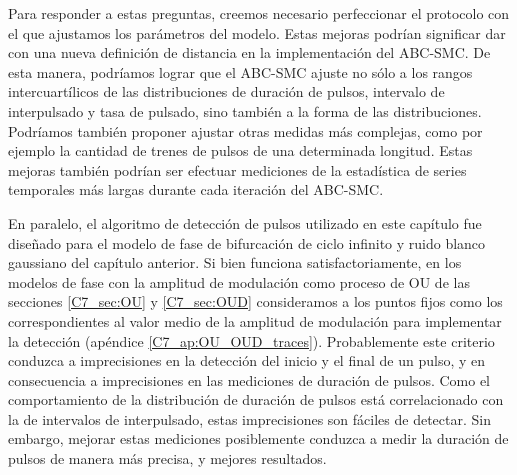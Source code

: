 \documentclass[./main.tex]{subfiles}
\begin{document}
Para responder a estas preguntas, creemos necesario perfeccionar el protocolo con el que ajustamos los parámetros del modelo. Estas mejoras podrían significar dar con una nueva definición de distancia en la implementación del ABC-SMC. De esta manera, podríamos lograr que el ABC-SMC ajuste no sólo a los rangos intercuartílicos de las distribuciones de duración de pulsos, intervalo de interpulsado y tasa de pulsado, sino también a la forma de las distribuciones. Podríamos también proponer ajustar otras medidas más complejas, como por ejemplo la cantidad de trenes de pulsos de una determinada longitud. Estas mejoras también podrían ser efectuar mediciones de la estadística de series temporales más largas durante cada iteración del ABC-SMC. 

En paralelo, el algoritmo de detección de pulsos utilizado en este capítulo fue diseñado para el modelo de fase de bifurcación de ciclo infinito y ruido blanco gaussiano del capítulo anterior. Si bien funciona satisfactoriamente, en los modelos de fase con la amplitud de modulación como proceso de OU de las secciones \ref{C7_sec:OU} y \ref{C7_sec:OUD} consideramos a los puntos fijos como los correspondientes al valor medio de la amplitud de modulación para implementar la detección (apéndice \ref{C7_ap:OU_OUD_traces}). Probablemente este criterio conduzca a imprecisiones en la detección del inicio y el final de un pulso, y en consecuencia a imprecisiones en las mediciones de duración de pulsos. Como el comportamiento de la distribución de duración de pulsos está correlacionado con la de intervalos de interpulsado, estas imprecisiones son fáciles de detectar. Sin embargo, mejorar estas mediciones posiblemente conduzca a medir la duración de pulsos de manera más precisa, y mejores resultados. 

\end{document}
